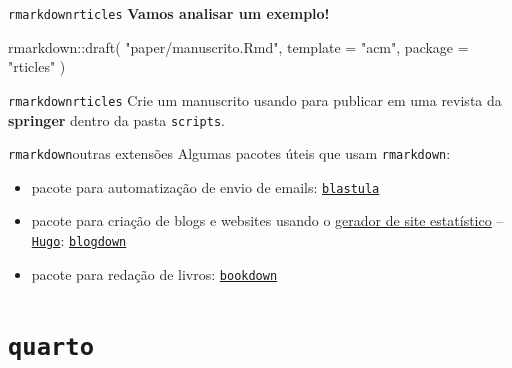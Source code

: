 \documentclass[
  10pt,
  ignorenonframetext,
]{beamer}
\newenvironment{Shaded}{\begin{snugshade}}{\end{snugshade}}
\newcommand{\AttributeTok}[1]{\textcolor[rgb]{0.40,0.45,0.13}{#1}}
\newcommand{\FunctionTok}[1]{\textcolor[rgb]{0.28,0.35,0.67}{#1}}
\newcommand{\NormalTok}[1]{\textcolor[rgb]{0.00,0.23,0.31}{#1}}
\newcommand{\SpecialCharTok}[1]{\textcolor[rgb]{0.37,0.37,0.37}{#1}}
\newcommand{\StringTok}[1]{\textcolor[rgb]{0.13,0.47,0.30}{#1}}
\providecommand{\tightlist}{%
  \setlength{\itemsep}{0pt}\setlength{\parskip}{0pt}}\usepackage{longtable,booktabs,array}
\begin{document}
\begin{frame}[fragile]{\texttt{rmarkdown}\newline \texttt{rticles}}
\protect\hypertarget{rmarkdownrticles-1}{}
\textbf{Vamos analisar um exemplo!}

\begin{Shaded}
\begin{Highlighting}[]
\NormalTok{rmarkdown}\SpecialCharTok{::}\FunctionTok{draft}\NormalTok{(}
    \StringTok{"paper/manuscrito.Rmd"}\NormalTok{,}
    \AttributeTok{template =} \StringTok{"acm"}\NormalTok{,}
    \AttributeTok{package =} \StringTok{"rticles"}
\NormalTok{)}
\end{Highlighting}
\end{Shaded}
\end{frame}

\begin{frame}[fragile]{\texttt{rmarkdown}\newline \texttt{rticles}}
\protect\hypertarget{rmarkdownrticles-2}{}
Crie um manuscrito usando para publicar em uma revista da
\textbf{springer} dentro da pasta \texttt{scripts}.
\end{frame}

\begin{frame}[fragile]{\texttt{rmarkdown}\newline outras extensões}
\protect\hypertarget{rmarkdownoutras-extensuxf5es}{}
Algumas pacotes úteis que usam \texttt{rmarkdown}:

\begin{itemize}
\tightlist
\item
  pacote para automatização de envio de emails:
  \href{https://rstudio.github.io/blastula/}{\texttt{blastula}}
\item
  pacote para criação de blogs e websites usando o
  \href{https://jamstack.org/}{gerador de site estatístico} --
  \href{https://gohugo.io/}{\texttt{Hugo}}:
  \href{https://bookdown.org/yihui/blogdown/}{\texttt{blogdown}}
\item
  pacote para redação de livros:
  \href{https://bookdown.org/yihui/bookdown/}{\texttt{bookdown}}
\end{itemize}
\end{frame}

\hypertarget{quarto}{%
\section{\texorpdfstring{\texttt{quarto}}{quarto}}\label{quarto}}
\end{document}
